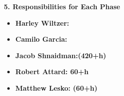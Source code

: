 \documentclass[12pt]{article}
\begin{document}
\textbf{5. Responsibilities for Each Phase}
\begin{itemize}
    \item \textbf{Harley Wiltzer: }%
    \item \textbf{Camilo Garcia: }
    \item \textbf{Jacob Shnaidman:(420+h) }
    \item \textbf{Robert Attard: 60+h}
    \item \textbf{Matthew Lesko: (60+h)} 
\end{itemize}
\end{document}
